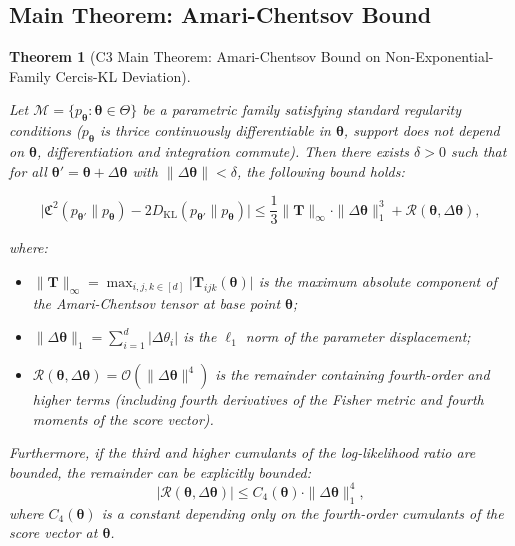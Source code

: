 \documentclass[12pt,a4paper]{article}
\theoremstyle{plain}
\newtheorem{theorem}{Theorem}
\theoremstyle{definition}
\theoremstyle{remark}
\newcommand{\MM}{\mathcal{M}}
\newcommand{\DKL}{D_{\mathrm{KL}}}
\newcommand{\CercisScore}{\mathfrak{C}}
\newcommand{\ACT}{\mathbf{T}}    %
\begin{document}
\subsection{Main Theorem: Amari-Chentsov Bound}

\begin{theorem}[C3 Main Theorem: Amari-Chentsov Bound on Non-Exponential-Family Cercis-KL Deviation]
\label{thm:C3_main}

Let $\MM = \{p_{\bm{\theta}} : \bm{\theta} \in \Theta\}$ be a parametric family satisfying standard regularity conditions ($p_{\bm{\theta}}$ is thrice continuously differentiable in $\bm{\theta}$, support does not depend on $\bm{\theta}$, differentiation and integration commute). Then there exists $\delta > 0$ such that for all $\bm{\theta}' = \bm{\theta} + \Delta\bm{\theta}$ with $\|\Delta\bm{\theta}\| < \delta$, the following bound holds:

\begin{equation}\label{eq:main_theorem_eq}
    \boxed{
    \bigl|\CercisScore^2(p_{\bm{\theta}'} \| p_{\bm{\theta}}) - 2\DKL(p_{\bm{\theta}'} \| p_{\bm{\theta}})\bigr|
    \leq \frac{1}{3} \|\ACT\|_{\infty} \cdot \|\Delta\bm{\theta}\|_1^3 + \mathcal{R}(\bm{\theta}, \Delta\bm{\theta}),
    }
\end{equation}

where:
\begin{itemize}
    \item $\|\ACT\|_{\infty} = \max_{i,j,k \in [d]} \bigl|\ACT_{ijk}(\bm{\theta})\bigr|$ is the maximum absolute component of the Amari-Chentsov tensor at base point $\bm{\theta}$;
    \item $\|\Delta\bm{\theta}\|_1 = \sum_{i=1}^d |\Delta\theta_i|$ is the $\ell_1$ norm of the parameter displacement;
    \item $\mathcal{R}(\bm{\theta}, \Delta\bm{\theta}) = \mathcal{O}(\|\Delta\bm{\theta}\|^4)$ is the remainder containing fourth-order and higher terms (including fourth derivatives of the Fisher metric and fourth moments of the score vector).
\end{itemize}

Furthermore, if the third and higher cumulants of the log-likelihood ratio are bounded, the remainder can be explicitly bounded:
\begin{equation}\label{eq:remainder_bound}
    |\mathcal{R}(\bm{\theta}, \Delta\bm{\theta})| \leq C_4(\bm{\theta}) \cdot \|\Delta\bm{\theta}\|_1^4,
\end{equation}
where $C_4(\bm{\theta})$ is a constant depending only on the fourth-order cumulants of the score vector at $\bm{\theta}$.
\end{theorem}
\end{document}
